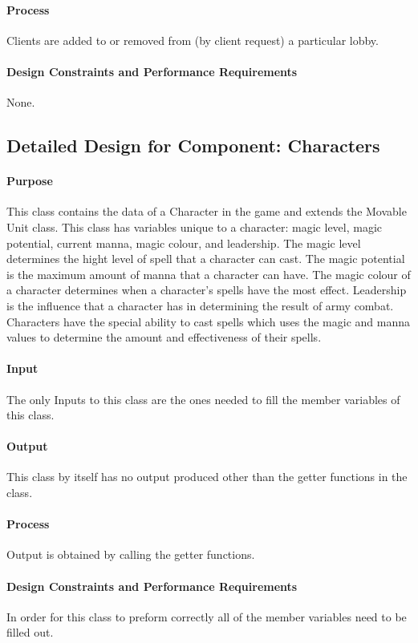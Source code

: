 \documentclass[12pt,a4paper,titlepage]{article}
\begin{document}
\paragraph{Process} Clients are added to or removed from (by client request) a particular lobby. 
\paragraph{Design Constraints and Performance Requirements} None.

\subsection{Detailed Design for Component: Characters}
\paragraph{Purpose} This class contains the data of a Character in the game and extends the Movable Unit class. This class has variables unique to a character: magic level, magic potential, current manna, magic colour, and leadership. The magic level determines the hight level of spell that a character can cast. The magic potential is the maximum amount of manna that a character can have. The magic colour of a character determines when a character's spells have the most effect. Leadership is the influence that a character has in determining the result of army combat. Characters have the special ability to cast spells which uses the magic and manna values to determine the amount and effectiveness of their spells. 
\paragraph{Input} The only Inputs to this class are the ones needed to fill the member variables of this class.
\paragraph{Output} This class by itself has no output produced other than the getter functions in the class.
\paragraph{Process} Output is obtained by calling the getter functions. 
\paragraph{Design Constraints and Performance Requirements} In order for this class to preform correctly all of the member variables need to be filled out.
\end{document}
